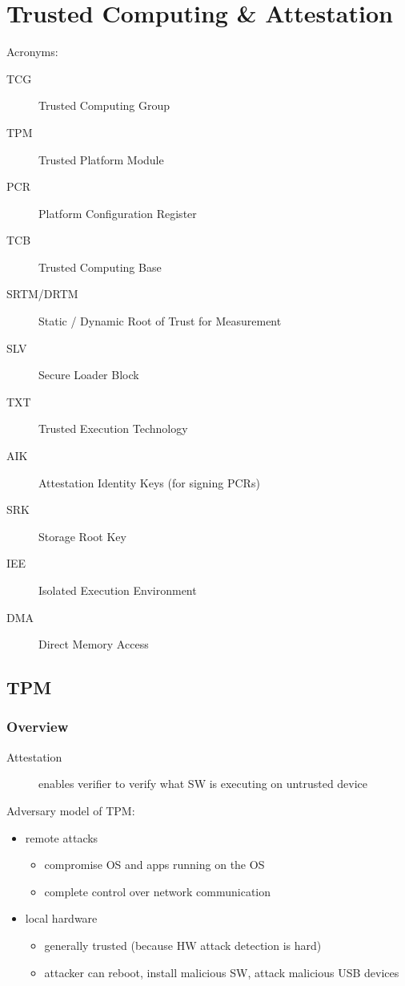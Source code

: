 
\section{Trusted Computing \& Attestation}
Acronyms:
\begin{description}
    \item[TCG] Trusted Computing Group
    \item[TPM] Trusted Platform Module
    \item[PCR] Platform Configuration Register
    \item[TCB] Trusted Computing Base
    \item[SRTM/DRTM] Static / Dynamic Root of Trust for Measurement
    \item[SLV] Secure Loader Block
    \item[TXT] Trusted Execution Technology
    \item[AIK] Attestation Identity Keys (for signing PCRs)
    \item[SRK] Storage Root Key
    \item[IEE] Isolated Execution Environment
    \item[DMA] Direct Memory Access
\end{description}
\subsection{TPM}
\subsubsection{Overview}
\begin{description}
    \item[Attestation] enables verifier to verify what SW is executing on untrusted device
\end{description}
Adversary model of TPM:
\begin{itemize}
    \item remote attacks 
        \begin{itemize}
            \item compromise OS and apps running on the OS
            \item complete control over network communication
        \end{itemize}
    \item local hardware
        \begin{itemize}
            \item generally trusted (because HW attack detection is hard)
            \item attacker can reboot, install malicious SW, attack malicious USB devices
        \end{itemize}
\end{itemize}

